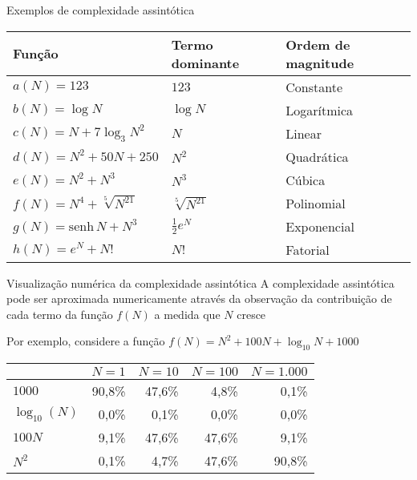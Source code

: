 \begin{frame}[fragile]{Exemplos de complexidade assintótica}

    \begin{table}[!ht]
        \centering
        \begin{tabular}{lll}
        \toprule
        \textbf{Função} & \textbf{Termo dominante} & \textbf{Ordem de magnitude} \\
        \midrule
        $a(N) = 123$ & $123$ & Constante \\
        \rowcolor[gray]{0.9}
        $b(N) = \log N$ & $\log N$ & Logarítmica \\
        $c(N) = N + 7\log_3 N^2$ & $N$ & Linear \\
        \rowcolor[gray]{0.9}
        $d(N)  = N^2 + 50N +  250$ & $N^2$ & Quadrática \\
        $e(N)  = N^2 + N^3$ & $N^3$ & Cúbica \\
        \rowcolor[gray]{0.9}
        $f(N) = N^4 + \sqrt[5]{N^{21}}$ & $\sqrt[5]{N^{21}}$ & Polinomial \\
        $g(N) = \mbox{senh}\, N + N^3$ & $ \frac{1}{2}e^N$ & Exponencial \\
        \rowcolor[gray]{0.9}
        $h(N) = e^N + N!$ & $ N!$ & Fatorial \\
        \bottomrule
        \end{tabular}
    \end{table}
	
\end{frame}

\begin{frame}[fragile]{Visualização numérica da complexidade assintótica}
    A complexidade assintótica pode ser aproximada numericamente através da observação da 
    contribuição de cada termo da função $f(N)$ a medida que $N$ cresce

    Por exemplo, considere a função $f(N) = N^2 + 100N + \log_{10} N + 1000 $

    \begin{table}[!ht]
        \centering
        \begin{tabular}{lrrrr}
        \toprule
            & $N = 1$ & $N = 10$ & $N = 100$ & $N = 1.000$ \\
        \midrule
        $1000$ & 90,8\% & 47,6\% & 4,8\% & 0,1\% \\
        \rowcolor[gray]{0.9}
        $\log_{10}(N)$ & 0,0\% & 0,1\% & 0,0\% & 0,0\% \\
        $100N$ & 9,1\% & 47,6\% & 47,6\% & 9,1\% \\ 
        \rowcolor[gray]{0.9}
        $N^2$ & 0,1\% & 4,7\% & 47,6\% & 90,8\% \\
        \bottomrule
        \end{tabular}
    \end{table}

\end{frame}
